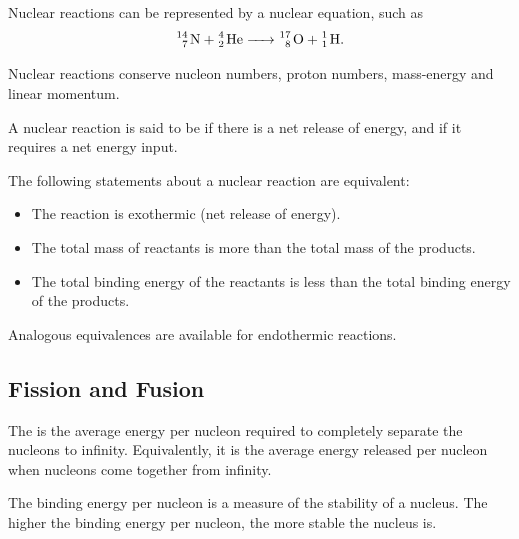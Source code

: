 Nuclear reactions can be represented by a nuclear equation, such as \[\ce{^{14}_7 N + ^4_2 He -> ^{17}_8 O + ^1_1 H}.\]

\begin{law}
    Nuclear reactions conserve nucleon numbers, proton numbers, mass-energy and linear momentum.
\end{law}

\begin{definition}
    A nuclear reaction is said to be  if there is a net release of energy, and  if it requires a net energy input.
\end{definition}

The following statements about a nuclear reaction are equivalent:
\begin{itemize}
    \item The reaction is exothermic (net release of energy).
    \item The total mass of reactants is more than the total mass of the products.
    \item The total binding energy of the reactants is less than the total binding energy of the products.
\end{itemize}

Analogous equivalences are available for endothermic reactions.

\subsection{Fission and Fusion}

\begin{definition}
    The  is the average energy per nucleon required to completely separate the nucleons to infinity. Equivalently, it is the average energy released per nucleon when nucleons come together from infinity.
\end{definition}

The binding energy per nucleon is a measure of the stability of a nucleus. The higher the binding energy per nucleon, the more stable the nucleus is.

